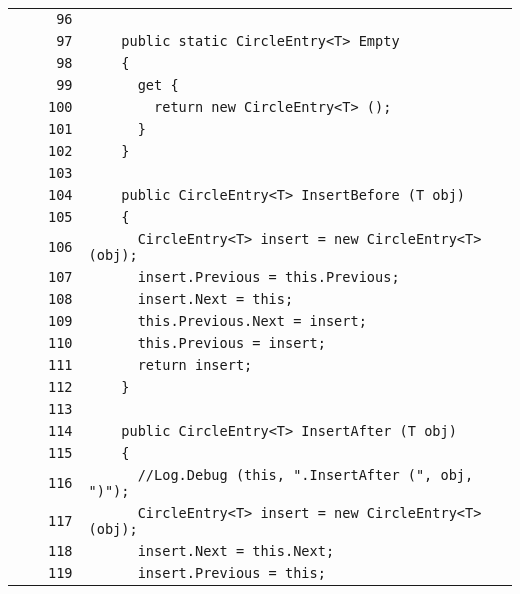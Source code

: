 \documentclass[a4paper,10pt]{article}
\begin{document}
\begin{longtable}[l]{lrrl}
\cellcolor{gray} &  & \verb~96~ & \verb~~\\
\cellcolor{gray} &  & \verb~97~ & \verb~    public static CircleEntry<T> Empty~\\
\cellcolor{gray} &  & \verb~98~ & \verb~    {~\\
\cellcolor{gray} &  & \verb~99~ & \verb~      get {~\\
\cellcolor{gray} &  & \verb~100~ & \verb~        return new CircleEntry<T> ();~\\
\cellcolor{gray} &  & \verb~101~ & \verb~      }~\\
\cellcolor{gray} &  & \verb~102~ & \verb~    }~\\
\cellcolor{gray} &  & \verb~103~ & \verb~~\\
\cellcolor{gray} &  & \verb~104~ & \verb~    public CircleEntry<T> InsertBefore (T obj)~\\
\cellcolor{gray} &  & \verb~105~ & \verb~    {~\\
\cellcolor{gray} &  & \verb~106~ & \verb~      CircleEntry<T> insert = new CircleEntry<T> (obj);~\\
\cellcolor{gray} &  & \verb~107~ & \verb~      insert.Previous = this.Previous;~\\
\cellcolor{gray} &  & \verb~108~ & \verb~      insert.Next = this;~\\
\cellcolor{gray} &  & \verb~109~ & \verb~      this.Previous.Next = insert;~\\
\cellcolor{gray} &  & \verb~110~ & \verb~      this.Previous = insert;~\\
\cellcolor{gray} &  & \verb~111~ & \verb~      return insert;~\\
\cellcolor{gray} &  & \verb~112~ & \verb~    }~\\
\cellcolor{gray} &  & \verb~113~ & \verb~~\\
\cellcolor{gray} &  & \verb~114~ & \verb~    public CircleEntry<T> InsertAfter (T obj)~\\
\cellcolor{gray} &  & \verb~115~ & \verb~    {~\\
\cellcolor{gray} &  & \verb~116~ & \verb~      //Log.Debug (this, ".InsertAfter (", obj, ")");~\\
\cellcolor{gray} &  & \verb~117~ & \verb~      CircleEntry<T> insert = new CircleEntry<T> (obj);~\\
\cellcolor{gray} &  & \verb~118~ & \verb~      insert.Next = this.Next;~\\
\cellcolor{gray} &  & \verb~119~ & \verb~      insert.Previous = this;~\\

\end{longtable}
\end{document}
